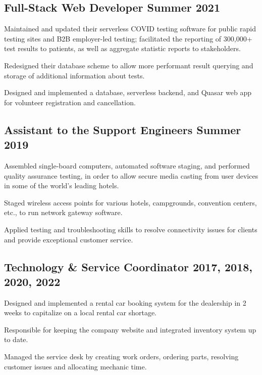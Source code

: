 \documentclass[letter,10pt]{article}
\begin{document}
\subsection{{Full-Stack Web Developer \hfill Summer 2021}}
\begin{zitemize}
\item Maintained and updated their serverless COVID testing software for public rapid testing sites and B2B employer-led testing; facilitated the reporting of 300,000+ test results to patients, as well as aggregate statistic reports to stakeholders.
\item Redesigned their database scheme to allow more performant result querying and storage of additional information about tests.
\item Designed and implemented a database, serverless backend, and Quasar web app for volunteer registration and cancellation.
\end{zitemize}

\subsection{{Assistant to the Support Engineers \hfill Summer 2019}}
\begin{zitemize}
\item Assembled single-board computers, automated software staging, and performed quality assurance testing, in order to allow secure media casting from user devices in some of the world's leading hotels.
\item Staged wireless access points for various hotels, campgrounds, convention centers, etc., to run network gateway software.
\item Applied testing and troubleshooting skills to resolve connectivity issues for clients and provide exceptional customer service.
\end{zitemize}

\subsection{{Technology \& Service Coordinator  \hfill 2017, 2018, 2020, 2022}}
\begin{zitemize}
\item Designed and implemented a rental car booking system for the dealership in 2 weeks to capitalize on a local rental car shortage.
\item Responsible for keeping the company website and integrated inventory system up to date.
\item Managed the service desk by creating work orders, ordering parts, resolving customer issues and allocating mechanic time.
\end{zitemize}
\end{document}
